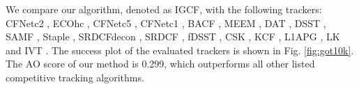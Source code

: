 \documentclass[review]{elsarticle}
\begin{document}
\begin{CJK*}{UTF8}{gbsn}
We compare our algorithm, denoted as IGCF, with the following trackers: CFNetc2 \cite{Valmadre2017EndtoEndRL}, ECOhc \cite{Danelljan2017ECOEC}, CFNetc5 \cite{Valmadre2017EndtoEndRL}, CFNetc1 \cite{Valmadre2017EndtoEndRL}, BACF \cite{Galoogahi2017LearningBC}, MEEM \cite{Zhang2014MEEMRT}, DAT \cite{Possegger2015InDO}, DSST \cite{Danelljan2014AccurateSE}, SAMF \cite{Li2014ASA}, Staple \cite{Bertinetto2016StapleC}, SRDCFdecon \cite{Danelljan2016AdaptiveDO}, SRDCF \cite{Danelljan2015LearningSR}, fDSST \cite{Danelljan2017DiscriminativeSS}, CSK \cite{Henriques2012ExploitingTC}, KCF \cite{Henriques2015HighSpeedTW}, L1APG \cite{Bao2012RealTR}, LK \cite{Shi1994GoodFT} and IVT \cite{Ross2007IncrementalLF}. The success plot of the evaluated trackers is shown in Fig. \ref{fig:got10k}.  The AO score of our method is 0.299, which outperforms all other listed competitive tracking algorithms.


\end{CJK*}
\end{document}
